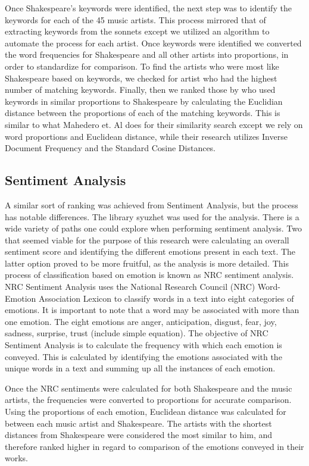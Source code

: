 \documentclass[11pt]{article}
\begin{document}
\noindent Once Shakespeare’s keywords were identified, the next step was to identify the keywords for each of the 45 music artists. This process mirrored that of extracting keywords from the sonnets except we utilized an algorithm to automate the process for each artist. Once keywords were identified we converted the word frequencies for Shakespeare and all other artists into proportions, in order to standardize for comparison. To find the artists who were most like Shakespeare based on keywords, we checked for artist who had the highest number of matching keywords. Finally, then we ranked those by who used keywords in similar proportions to Shakespeare by calculating the Euclidian distance between the proportions of each of the matching keywords. This is similar to what Mahedero et. Al \cite{NLP-for-lyrics} does for their similarity search except we rely on word proportions and Euclidean distance, while their research utilizes Inverse Document Frequency and the Standard Cosine Distances. 

\subsection{Sentiment Analysis}
A similar sort of ranking was achieved from Sentiment Analysis, but the process has notable differences. The library syuzhet was used for the analysis. There is a wide variety of paths one could explore when performing sentiment analysis. Two that seemed viable for the purpose of this research were calculating an overall sentiment score and identifying the different emotions present in each text. \cite{syuzhet} The latter option proved to be more fruitful, as the analysis is more detailed. This process of classification based on emotion is known as NRC sentiment analysis. NRC Sentiment Analysis uses the National Research Council (NRC) Word-Emotion Association Lexicon to classify words in a text into eight categories of emotions. \cite{nrc-sentiment} It is important to note that a word may be associated with more than one emotion. The eight emotions are anger, anticipation, disgust, fear, joy, sadness, surprise, trust (include simple equation). \cite{nrc-sentiment} The objective of NRC Sentiment Analysis is to calculate the frequency with which each emotion is conveyed. This is calculated by identifying the emotions associated with the unique words in a text and summing up all the instances of each emotion\cite{syuzhet}. 

\noindent Once the NRC sentiments were calculated for both Shakespeare and the music artists, the frequencies were converted to proportions for accurate comparison. Using the proportions of each emotion, Euclidean distance was calculated for between each music artist and Shakespeare. The artists with the shortest distances from Shakespeare were considered the most similar to him, and therefore ranked higher in regard to comparison of the emotions conveyed in their works. 
\end{document}
